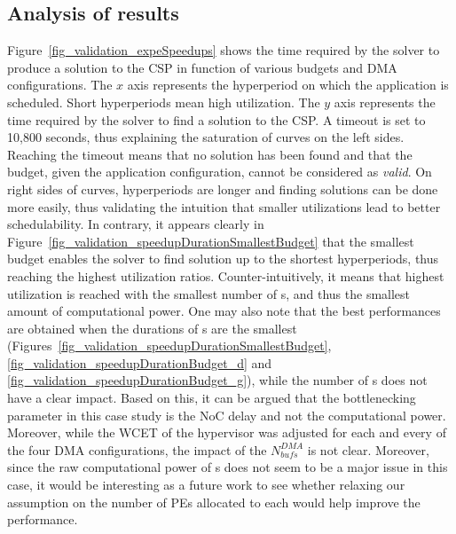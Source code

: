 \documentclass[main.tex]{subfiles}
\begin{document}
\subsection{Analysis of results}
Figure~\ref{fig_validation_expeSpeedups} shows the time required by the solver
to produce a solution to the CSP in function of various budgets and DMA
configurations. The $x$ axis represents the hyperperiod on which the
application is scheduled. Short hyperperiods mean high utilization. The $y$
axis represents the time required by the solver to find a solution to the CSP.
A timeout is set to 10,800 seconds, thus explaining the saturation of curves on
the left sides. Reaching the timeout means that no solution has been found and
that the budget, given the application configuration, cannot be considered as
\emph{valid}. On right sides of curves, hyperperiods are longer and finding
solutions can be done more easily, thus validating the intuition that smaller
utilizations lead to better schedulability.
In contrary, it appears clearly in
Figure~\ref{fig_validation_speedupDurationSmallestBudget} that the smallest
budget enables the solver to find solution up to the shortest hyperperiods,
thus reaching the highest utilization ratios. Counter-intuitively, it means
that highest utilization is reached with the smallest number of \PN{}s, and
thus the smallest amount of computational power. One may also note that the
best performances are obtained when the durations of \PC{}s are the smallest
(Figures~\ref{fig_validation_speedupDurationSmallestBudget},
\ref{fig_validation_speedupDurationBudget_d} and
\ref{fig_validation_speedupDurationBudget_g}), while the number of \PN{}s does
not have a clear impact. Based on this, it can be argued that the bottlenecking
parameter in this case study is the NoC delay and not the computational power.
Moreover, while the WCET of the hypervisor was adjusted for each and every of
the four DMA configurations, the impact of the $N_{bufs}^{DMA}$ is not clear.
Moreover, since the raw computational power of \PN{}s does not seem to be a
major issue in this case, it would be interesting as a future work to see
whether relaxing our assumption on the number of PEs allocated to each \PN{}
would help improve the performance. 
\end{document}
